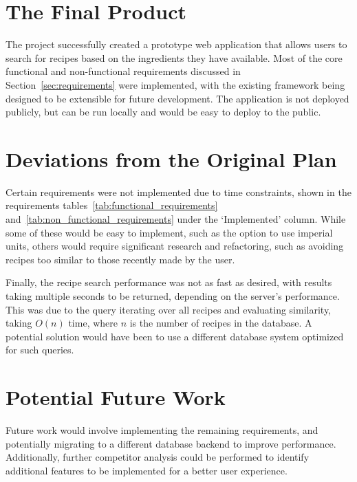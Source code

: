 {
\let\clearpage\relax

\section{The Final Product}

The project successfully created a prototype web application that allows users to search for recipes based on the ingredients they have available.
Most of the core functional and non-functional requirements discussed in Section~\ref{sec:requirements} were implemented, with the existing
framework being designed to be extensible for future development. The application is not deployed publicly, but can be run locally and would
be easy to deploy to the public.

\section{Deviations from the Original Plan}

Certain requirements were not implemented due to time constraints, shown in the requirements tables~\ref{tab:functional_requirements}
and~\ref{tab:non_functional_requirements} under the \enquote*{Implemented} column. While some of these would be easy to implement,
such as the option to use imperial units, others would require significant research and refactoring, such as avoiding recipes too
similar to those recently made by the user.

Finally, the recipe search performance was not as fast as desired, with results taking multiple seconds to be returned, depending on the
server's performance. This was due to the query iterating over all recipes and evaluating similarity, taking $O(n)$ time, where $n$ is
the number of recipes in the database. A potential solution would have been to use a different database system optimized for such queries.

\section{Potential Future Work}

Future work would involve implementing the remaining requirements, and potentially migrating to a different database backend to improve
performance. Additionally, further competitor analysis could be performed to identify additional features to be implemented for a better
user experience.

} %
